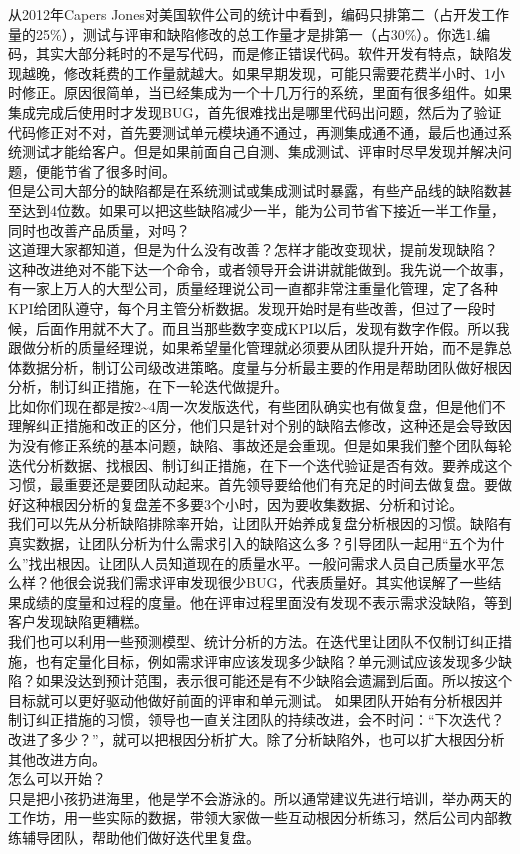 {\begin{minipage}[t]{0.97\columnwidth}
从2012年Capers
Jones对美国软件公司的统计中看到，编码只排第二（占开发工作量的25\%），测试与评审和缺陷修改的总工作量才是排第一（占30\%）。你选1.编码，其实大部分耗时的不是写代码，而是修正错误代码。软件开发有特点，缺陷发现越晚，修改耗费的工作量就越大。如果早期发现，可能只需要花费半小时、1小时修正。原因很简单，当已经集成为一个十几万行的系统，里面有很多组件。如果集成完成后使用时才发现BUG，首先很难找出是哪里代码出问题，然后为了验证代码修正对不对，首先要测试单元模块通不通过，再测集成通不通，最后也通过系统测试才能给客户。但是如果前面自己自测、集成测试、评审时尽早发现并解决问题，便能节省了很多时间。\\
但是公司大部分的缺陷都是在系统测试或集成测试时暴露，有些产品线的缺陷数甚至达到4位数。如果可以把这些缺陷减少一半，能为公司节省下接近一半工作量，同时也改善产品质量，对吗？\\
这道理大家都知道，但是为什么没有改善？怎样才能改变现状，提前发现缺陷？\\
这种改进绝对不能下达一个命令，或者领导开会讲讲就能做到。我先说一个故事，有一家上万人的大型公司，质量经理说公司一直都非常注重量化管理，定了各种KPI给团队遵守，每个月主管分析数据。发现开始时是有些改善，但过了一段时候，后面作用就不大了。而且当那些数字变成KPI以后，发现有数字作假。所以我跟做分析的质量经理说，如果希望量化管理就必须要从团队提升开始，而不是靠总体数据分析，制订公司级改进策略。度量与分析最主要的作用是帮助团队做好根因分析，制订纠正措施，在下一轮迭代做提升。\\
比如你们现在都是按2\textasciitilde{}4周一次发版迭代，有些团队确实也有做复盘，但是他们不理解纠正措施和改正的区分，他们只是针对个别的缺陷去修改，这种还是会导致因为没有修正系统的基本问题，缺陷、事故还是会重现。但是如果我们整个团队每轮迭代分析数据、找根因、制订纠正措施，在下一个迭代验证是否有效。要养成这个习惯，最重要还是要团队动起来。首先领导要给他们有充足的时间去做复盘。要做好这种根因分析的复盘差不多要3个小时，因为要收集数据、分析和讨论。\\
我们可以先从分析缺陷排除率开始，让团队开始养成复盘分析根因的习惯。缺陷有真实数据，让团队分析为什么需求引入的缺陷这么多？引导团队一起用``五个为什么''找出根因。让团队人员知道现在的质量水平。一般问需求人员自己质量水平怎么样？他很会说我们需求评审发现很少BUG，代表质量好。其实他误解了一些结果成绩的度量和过程的度量。他在评审过程里面没有发现不表示需求没缺陷，等到客户发现缺陷更糟糕。\\
我们也可以利用一些预测模型、统计分析的方法。在迭代里让团队不仅制订纠正措施，也有定量化目标，例如需求评审应该发现多少缺陷？单元测试应该发现多少缺陷？如果没达到预计范围，表示很可能还是有不少缺陷会遗漏到后面。所以按这个目标就可以更好驱动他做好前面的评审和单元测试。
如果团队开始有分析根因并制订纠正措施的习惯，领导也一直关注团队的持续改进，会不时问：``下次迭代？改进了多少？''，就可以把根因分析扩大。除了分析缺陷外，也可以扩大根因分析其他改进方向。\\
怎么可以开始？\\
只是把小孩扔进海里，他是学不会游泳的。所以通常建议先进行培训，举办两天的工作坊，用一些实际的数据，带领大家做一些互动根因分析练习，然后公司内部教练辅导团队，帮助他们做好迭代里复盘。\\
\strut
\end{minipage}} 

